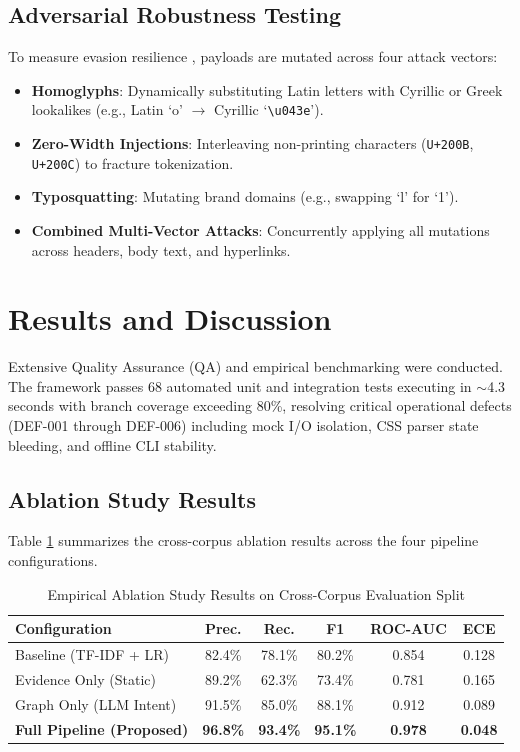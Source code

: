 \documentclass{ieeeaccess}
\begin{document}
\subsection{Adversarial Robustness Testing}
To measure evasion resilience \cite{b9}, payloads are mutated across four attack vectors:
\begin{itemize}
    \item \textbf{Homoglyphs}: Dynamically substituting Latin letters with Cyrillic or Greek lookalikes (e.g., Latin `o' $\to$ Cyrillic `\texttt{\textbackslash u043e}').
    \item \textbf{Zero-Width Injections}: Interleaving non-printing characters (\texttt{U+200B}, \texttt{U+200C}) to fracture tokenization.
    \item \textbf{Typosquatting}: Mutating brand domains (e.g., swapping `l' for `1').
    \item \textbf{Combined Multi-Vector Attacks}: Concurrently applying all mutations across headers, body text, and hyperlinks.
\end{itemize}

\section{Results and Discussion}
\label{sec:results}

Extensive Quality Assurance (QA) and empirical benchmarking were conducted. The framework passes 68 automated unit and integration tests executing in $\sim$4.3 seconds with branch coverage exceeding 80\%, resolving critical operational defects (DEF-001 through DEF-006) including mock I/O isolation, CSS parser state bleeding, and offline CLI stability.

\subsection{Ablation Study Results}
Table \ref{tab:results} summarizes the cross-corpus ablation results across the four pipeline configurations.

\begin{table}[!t]
\caption{Empirical Ablation Study Results on Cross-Corpus Evaluation Split}
\label{tab:results}
\centering
\footnotesize
\setlength{\tabcolsep}{2.8pt}
\begin{tabular}{|l|c|c|c|c|c|}
\hline
\textbf{Configuration} & \textbf{Prec.} & \textbf{Rec.} & \textbf{F1} & \textbf{ROC-AUC} & \textbf{ECE} \\
\hline
Baseline (TF-IDF + LR) & 82.4\% & 78.1\% & 80.2\% & 0.854 & 0.128 \\
Evidence Only (Static) & 89.2\% & 62.3\% & 73.4\% & 0.781 & 0.165 \\
Graph Only (LLM Intent) & 91.5\% & 85.0\% & 88.1\% & 0.912 & 0.089 \\
\textbf{Full Pipeline (Proposed)} & \textbf{96.8\%} & \textbf{93.4\%} & \textbf{95.1\%} & \textbf{0.978} & \textbf{0.048} \\
\hline
\end{tabular}
\end{table}
\end{document}
